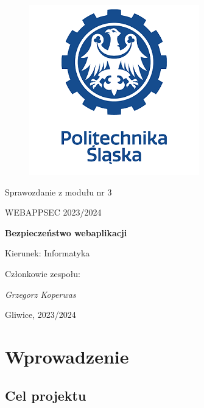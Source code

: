 \documentclass[12pt,a4paper]{article}
\begin{document}
\renewcommand\thesection{\arabic{section}.}
\renewcommand\thesubsection{\arabic{section}.\arabic{subsection}.}
\renewcommand\thesubsubsection{\arabic{section}.\arabic{subsection}.\arabic{subsubsection}.}

\clearpage
\begin{figure}[h]
\centering
\includegraphics{media/ps-logo.png}
\end{figure}
\hspace{3cm}
\begin{center}Sprawozdanie z modułu nr 3\end{center}
\begin{center}WEBAPPSEC 2023/2024\end{center}
\hspace{3cm}
\begin{center}\large\textbf{Bezpieczeństwo webaplikacji}\end{center}
\hspace{7cm}
\begin{flushright}Kierunek: Informatyka
\end{flushright}
\begin{flushright}Członkowie zespołu:
\par
\textit{Grzegorz Koperwas}
\end{flushright}
\vfill
\begin{center}Gliwice, 2023/2024\end{center}

\newpage
{}
\tableofcontents

\newpage

\section{Wprowadzenie}

\subsection{Cel projektu}
\end{document}
